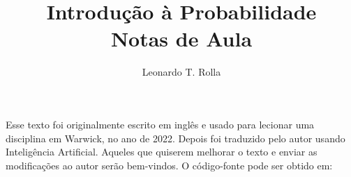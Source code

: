 


\clearpage

\title{Introdução à Probabilidade \\ Notas de Aula}
\author{Leonardo T. Rolla}
\maketitle

\bigskip
\bigskip
\bigskip
\bigskip
\bigskip


Esse texto foi originalmente escrito em inglês e usado para lecionar uma disciplina em Warwick, no ano de 2022.
Depois foi traduzido pelo autor usando Inteligência Artificial.
Aqueles que quiserem melhorar o texto e enviar as modificações ao autor serão bem-vindos.
O código-fonte pode ser obtido em:

\mysourceurl


\clearpage
